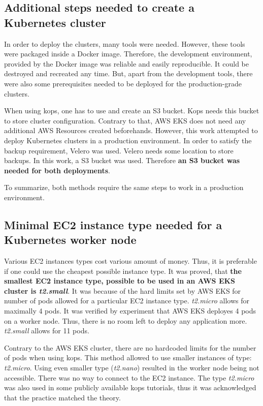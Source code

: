 \subsection{Additional steps needed to create a Kubernetes cluster}
In order to deploy the clusters, many tools were needed. However, these tools were packaged inside a Docker image. Therefore, the development environment, provided by the Docker image was reliable and easily reproducible. It could be destroyed and recreated any time. But, apart from the development tools, there were also some prerequisites needed to be deployed for the production-grade clusters.

When using kops, one has to use and create an S3 bucket. Kops needs this bucket to store cluster configuration. Contrary to that, AWS EKS does not need any additional AWS Resources created beforehands. However, this work attempted to deploy Kubernetes clusters in a production environment. In order to satisfy the backup requirement, Velero was used. Velero needs some location to store backups. In this work, a S3 bucket was used. Therefore \textbf{an S3 bucket was needed for both deployments}.

To summarize, both methods require the same steps to work in a production environment.

\subsection{Minimal EC2 instance type needed for a Kubernetes worker node}
Various EC2 instances types cost various amount of money. Thus, it is preferable if one could use the cheapest possible instance type. It was proved, that \textbf{the smallest EC2 instance type, possible to be used in an AWS EKS cluster is \textit{t2.small}}. It was because of the hard limits set by AWS EKS for number of pods allowed for a particular EC2 instance type. \textit{t2.micro} allows for maximally 4 pods\cite{eks-hard-limits}. It was verified by experiment that AWS EKS deployes 4 pods on a worker node. Thus, there is no room left to deploy any application more. \textit{t2.small} allows for 11 pods.

Contrary to the AWS EKS cluster, there are no hardcoded limits for the number of pods when using kops. This method allowed to use smaller instances of type: \textit{t2.micro}. Using even smaller type (\textit{t2.nano}) resulted in the worker node being not accessible. There was no way to connect to the EC2 instance. The type \textit{t2.micro} was also used in some publicly available kops tutorials, thus it was acknowledged that the practice matched the theory.


